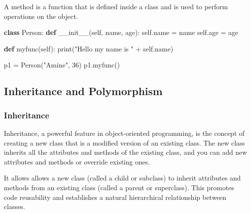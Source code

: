 \documentclass[11pt]{article}
\newenvironment{Shaded}{}{}
\newcommand{\KeywordTok}[1]{\textcolor[rgb]{0.00,0.44,0.13}{\textbf{{#1}}}}
\newcommand{\DecValTok}[1]{\textcolor[rgb]{0.25,0.63,0.44}{{#1}}}
\newcommand{\StringTok}[1]{\textcolor[rgb]{0.25,0.44,0.63}{{#1}}}
\newcommand{\FunctionTok}[1]{\textcolor[rgb]{0.02,0.16,0.49}{{#1}}}
\newcommand{\NormalTok}[1]{{#1}}
\newcommand{\VariableTok}[1]{\textcolor[rgb]{0.10,0.09,0.49}{{#1}}}
\newcommand{\OperatorTok}[1]{\textcolor[rgb]{0.40,0.40,0.40}{{#1}}}
\newcommand{\BuiltInTok}[1]{{#1}}
\begin{document}
A method is a function that is defined inside a class and is used to
perform operations on the object.

\begin{Shaded}
\begin{Highlighting}[]
\KeywordTok{class}\NormalTok{ Person:}
    \KeywordTok{def} \FunctionTok{\_\_init\_\_}\NormalTok{(}\VariableTok{self}\NormalTok{, name, age):}
        \VariableTok{self}\NormalTok{.name }\OperatorTok{=}\NormalTok{ name}
        \VariableTok{self}\NormalTok{.age }\OperatorTok{=}\NormalTok{ age}

    \KeywordTok{def}\NormalTok{ myfunc(}\VariableTok{self}\NormalTok{):}
        \BuiltInTok{print}\NormalTok{(}\StringTok{"Hello my name is "} \OperatorTok{+} \VariableTok{self}\NormalTok{.name)}

\NormalTok{p1 }\OperatorTok{=}\NormalTok{ Person(}\StringTok{"Amine"}\NormalTok{, }\DecValTok{36}\NormalTok{)}
\NormalTok{p1.myfunc()}
\end{Highlighting}
\end{Shaded}

\subsection{Inheritance and
Polymorphism}\label{inheritance-and-polymorphism}

\subsubsection{Inheritance}\label{inheritance}

Inheritance, a powerful feature in object-oriented programming, is the
concept of creating a new class that is a modified version of an
existing class. The new class inherits all the attributes and methods of
the existing class, and you can add new attributes and methods or
override existing ones.

It allows allows a new class (called a child or subclass) to inherit
attributes and methods from an existing class (called a parent or
superclass). This promotes code reusability and establishes a natural
hierarchical relationship between classes.
\end{document}
